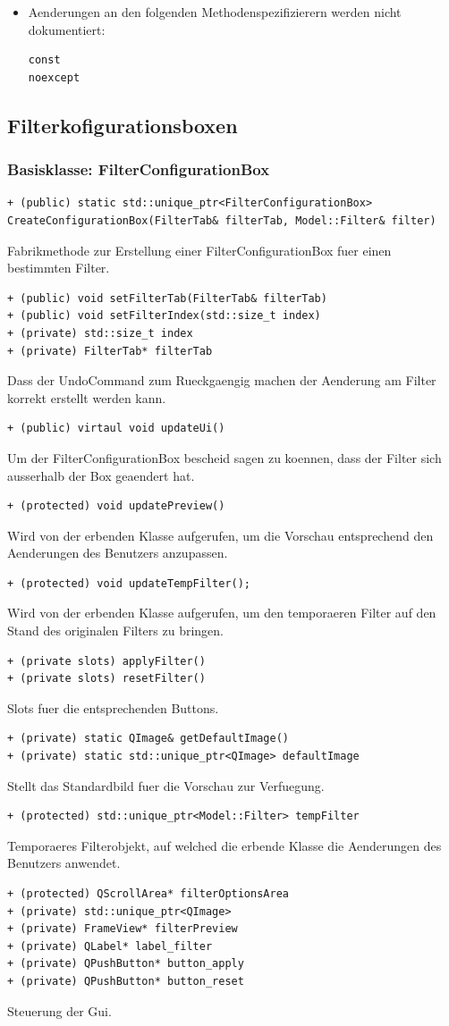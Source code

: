 \documentclass{scrartcl}
\begin{document}
{\begin{itemize}
\item Aenderungen an den folgenden Methodenspezifizierern werden nicht dokumentiert:
\begin{verbatim}
const
noexcept
\end{verbatim}

\end{itemize}
\newpage
\subsection{Filterkofigurationsboxen}
\subsubsection{Basisklasse: FilterConfigurationBox}
\begin{verbatim}
+ (public) static std::unique_ptr<FilterConfigurationBox>
CreateConfigurationBox(FilterTab& filterTab, Model::Filter& filter)
\end{verbatim}
Fabrikmethode zur Erstellung einer FilterConfigurationBox fuer einen bestimmten Filter.
\begin{verbatim}
+ (public) void setFilterTab(FilterTab& filterTab)
+ (public) void setFilterIndex(std::size_t index)
+ (private) std::size_t index
+ (private) FilterTab* filterTab
\end{verbatim}
Dass der UndoCommand zum Rueckgaengig machen der Aenderung am Filter korrekt erstellt werden kann.
\begin{verbatim}
+ (public) virtaul void updateUi()
\end{verbatim}
Um der FilterConfigurationBox bescheid sagen zu koennen, dass der Filter sich ausserhalb der Box geaendert hat.
\begin{verbatim}
+ (protected) void updatePreview()
\end{verbatim}
Wird von der erbenden Klasse aufgerufen, um die Vorschau entsprechend den Aenderungen des Benutzers anzupassen.
\begin{verbatim}
+ (protected) void updateTempFilter();
\end{verbatim}
Wird von der erbenden Klasse aufgerufen, um den temporaeren Filter auf den Stand des originalen Filters zu bringen.
\begin{verbatim}
+ (private slots) applyFilter()
+ (private slots) resetFilter()
\end{verbatim}
Slots fuer die entsprechenden Buttons.
\begin{verbatim}
+ (private) static QImage& getDefaultImage()
+ (private) static std::unique_ptr<QImage> defaultImage
\end{verbatim}
Stellt das Standardbild fuer die Vorschau zur Verfuegung.
\begin{verbatim}
+ (protected) std::unique_ptr<Model::Filter> tempFilter
\end{verbatim}
Temporaeres Filterobjekt, auf welched die erbende Klasse die Aenderungen des Benutzers anwendet.
\begin{verbatim}
+ (protected) QScrollArea* filterOptionsArea
+ (private) std::unique_ptr<QImage>
+ (private) FrameView* filterPreview
+ (private) QLabel* label_filter
+ (private) QPushButton* button_apply
+ (private) QPushButton* button_reset
\end{verbatim}
Steuerung der Gui.
}
\end{document}
